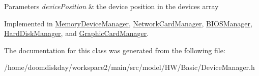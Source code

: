 \begin{DoxyParams}{Parameters}
{\em device\+Position} & the device position in the devices array \\
\hline
\end{DoxyParams}


Implemented in \hyperlink{classMemoryDeviceManager_a0246a46d583a717dfabc625a5e387400}{Memory\+Device\+Manager}, \hyperlink{classNetworkCardManager_a9204cc788a83cafc73b2f798963417a2}{Network\+Card\+Manager}, \hyperlink{classBIOSManager_aaa51bf1d61f4609484a9903fe5a6340e}{B\+I\+O\+S\+Manager}, \hyperlink{classHardDiskManager_a8e219e6e508dd2d8a6190c44bcf45782}{Hard\+Disk\+Manager}, and \hyperlink{classGraphicCardManager_a42bc616062f94b2e4ee92a79ba537a16}{Graphic\+Card\+Manager}.



The documentation for this class was generated from the following file\+:\begin{DoxyCompactItemize}
\item 
/home/doomdiskday/workspace2/main/src/model/\+H\+W/\+Basic/Device\+Manager.\+h\end{DoxyCompactItemize}
